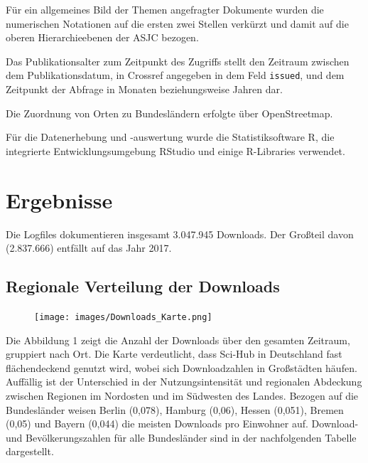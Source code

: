 \documentclass[a4paper,
fontsize=11pt,
oneside,
numbers=noperiodatend,
parskip=half-,
bibliography=totoc,
final
]{scrartcl}
\begin{document}
Für ein allgemeines Bild der Themen angefragter Dokumente wurden die
numerischen Notationen auf die ersten zwei Stellen verkürzt und damit
auf die oberen Hierarchieebenen der ASJC bezogen.

Das Publikationsalter zum Zeitpunkt des Zugriffs stellt den Zeitraum
zwischen dem Publikationsdatum, in Crossref angegeben in dem Feld
\texttt{issued}, und dem Zeitpunkt der Abfrage in Monaten
beziehungsweise Jahren dar.

Die Zuordnung von Orten zu Bundesländern erfolgte über OpenStreetmap.

Für die Datenerhebung und -auswertung wurde die Statistiksoftware R, die
integrierte Entwicklungsumgebung RStudio und einige R-Libraries
verwendet.

\hypertarget{ergebnisse}{%
\section{Ergebnisse}\label{ergebnisse}}

Die Logfiles dokumentieren insgesamt 3.047.945 Downloads. Der Großteil
davon (2.837.666) entfällt auf das Jahr 2017.

\hypertarget{regionale-verteilung-der-downloads}{%
\subsection{Regionale Verteilung der
Downloads}\label{regionale-verteilung-der-downloads}}

\begin{figure}
\centering
\texttt{[image: images/Downloads\_Karte.png]}
\end{figure}

Die Abbildung 1 zeigt die Anzahl der Downloads über den gesamten
Zeitraum, gruppiert nach Ort. Die Karte verdeutlicht, dass Sci-Hub in
Deutschland fast flächendeckend genutzt wird, wobei sich Downloadzahlen
in Großstädten häufen. Auffällig ist der Unterschied in der
Nutzungsintensität und regionalen Abdeckung zwischen Regionen im
Nordosten und im Südwesten des Landes. Bezogen auf die Bundesländer
weisen Berlin (0,078), Hamburg (0,06), Hessen (0,051), Bremen (0,05) und
Bayern (0,044) die meisten Downloads pro Einwohner auf. Download- und
Bevölkerungszahlen für alle Bundesländer sind in der nachfolgenden
Tabelle dargestellt.
\end{document}
